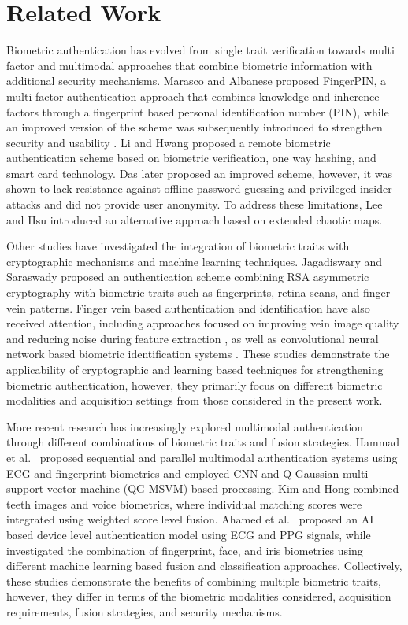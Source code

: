 \documentclass[runningheads]{llncs}
\begin{document}
\section{Related Work}\label{sec:related}
Biometric authentication has evolved from single trait verification towards multi factor and multimodal approaches that combine biometric information with additional security mechanisms. Marasco and Albanese \cite{IEEEtran37} proposed FingerPIN, a multi factor authentication approach that combines knowledge and inherence factors through a fingerprint based personal identification number (PIN), while an improved version of the scheme was subsequently introduced to strengthen security and usability \cite{IEEEtran38}. Li and Hwang \cite{IEEEtran32} proposed a remote biometric authentication scheme based on biometric verification, one way hashing, and smart card technology. Das \cite{IEEEtran33} later proposed an improved scheme, however, it was shown to lack resistance against offline password guessing and privileged insider attacks and did not provide user anonymity. To address these limitations, Lee and Hsu \cite{IEEEtran56} introduced an alternative approach based on extended chaotic maps.

Other studies have investigated the integration of biometric traits with cryptographic mechanisms and machine learning techniques. Jagadiswary and Saraswady \cite{IEEEtran58} proposed an authentication scheme combining RSA asymmetric cryptography with biometric traits such as fingerprints, retina scans, and finger-vein patterns. Finger vein based authentication and identification have also received attention, including approaches focused on improving vein image quality and reducing noise during feature extraction \cite{IEEEtran61}, as well as convolutional neural network based biometric identification systems \cite{IEEEtran62}. These studies demonstrate the applicability of cryptographic and learning based techniques for strengthening biometric authentication, however, they primarily focus on different biometric modalities and acquisition settings from those considered in the present work.

More recent research has increasingly explored multimodal authentication through different combinations of biometric traits and fusion strategies. Hammad et al.\ \cite{r1} proposed sequential and parallel multimodal authentication systems using ECG and fingerprint biometrics and employed CNN and Q-Gaussian multi support vector machine (QG-MSVM) based processing. Kim and Hong \cite{r4} combined teeth images and voice biometrics, where individual matching scores were integrated using weighted score level fusion. Ahamed et al.\ \cite{r2} proposed an AI based device level authentication model using ECG and PPG signals, while \cite{r3} investigated the combination of fingerprint, face, and iris biometrics using different machine learning based fusion and classification approaches. Collectively, these studies demonstrate the benefits of combining multiple biometric traits, however, they differ in terms of the biometric modalities considered, acquisition requirements, fusion strategies, and security mechanisms.
\end{document}
